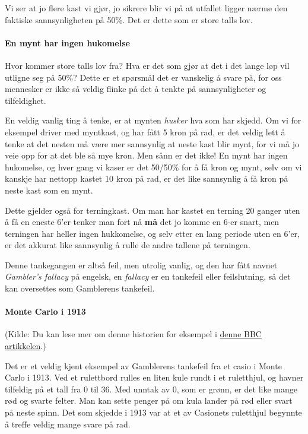 \documentclass[11pt]{article}
\begin{document}
    Vi ser at jo flere kast vi gjør, jo sikrere blir vi på at utfallet
ligger nærme den faktiske sannsynligheten på 50\%. Det er dette som er
store talls lov.

    \paragraph{En mynt har ingen
hukomelse}\label{en-mynt-har-ingen-hukomelse}

Hvor kommer store talls lov fra? Hva er det som gjør at det i det lange
løp vil utligne seg på 50\%? Dette er et spørsmål det er vanskelig å
svare på, for oss mennesker er ikke så veldig flinke på det å tenkte på
sannsynligheter og tilfeldighet.

En veldig vanlig ting å tenke, er at mynten \emph{husker} hva som har
skjedd. Om vi for eksempel driver med myntkast, og har fått 5 kron på
rad, er det veldig lett å tenke at det nesten må være mer sannsynlig at
neste kast blir mynt, for vi må jo veie opp for at det ble så mye kron.
Men sånn er det ikke! En mynt har ingen hukomelse, og hver gang vi kaser
er det 50/50\% for å få kron og mynt, selv om vi kanskje har nettopp
kastet 10 kron på rad, er det like sannsynlig å få kron på neste kast
som en mynt.

Dette gjelder også for terningkast. Om man har kastet en terning 20
ganger uten å få en eneste 6'er tenker man fort nå \textbf{må} det jo
komme en 6-er snart, men terningen har heller ingen hukkomelse, og selv
etter en lang periode uten en 6'er, er det akkurat like sannsynlig å
rulle de andre tallene på terningen.

Denne tankegangen er altså feil, men utrolig vanlig, og den har fått
navnet \emph{Gambler's fallacy} på engelsk, en \emph{fallacy} er en
tankefeil eller feilslutning, så det kan oversettes som Gamblerens
tankefeil.

\paragraph{Monte Carlo i 1913}\label{monte-carlo-i-1913}

(Kilde: Du kan lese mer om denne historien for eksempel i
\href{http://www.bbc.com/future/story/20150127-why-we-gamble-like-monkeys}{denne
BBC artikkelen}.)

Det er et veldig kjent eksempel av Gamblerens tankefeil fra et casio i
Monte Carlo i 1913. Ved et rulettbord rulles en liten kule rundt i et
ruletthjul, og havner tilfeldig på et tall fra 0 til 36. Med unntak av
0, som er grønn, er det like mange rød og svarte felter. Man kan sette
penger på om kula lander på rød eller svart på neste spinn. Det som
skjedde i 1913 var at et av Casionets ruletthjul begynnte å treffe
veldig mange svare på rad.
\end{document}
